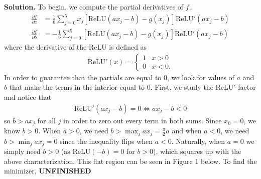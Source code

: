 \documentclass{letter}
\newcommand{\Solution}[1]{%
	\textbf{Solution.} #1 \par%
}
\newcommand{\UNFINISHED}{\textbf{\color{red} UNFINISHED}}
\newcommand{\relu}{\mathrm{ReLU}}
\begin{document}
    \Solution{To begin, we compute the partial derivatives of $f$. \begin{align*}
        \frac{\partial f}{\partial a} &= \frac{1}{6}\sum_{j = 0}^5 x_j[\relu(ax_j - b) - g(x_j)]\relu'(ax_j - b) \\
        \frac{\partial f}{\partial b} &= -\frac{1}{6}\sum_{j = 0}^5 [\relu(ax_j - b) - g(x_j)]\relu'(ax_j - b)
    \end{align*} where the derivative of the $\relu$ is defined as \begin{align*}
        \relu'(x) = \begin{cases} 1 & x > 0 \\ 0 & x < 0. \end{cases}
    \end{align*} In order to guarantee that the partials are equal to 0, we look for values of $a$ and $b$ that make the terms in the interior equal to 0. First, we study the $\relu'$ factor and notice that \begin{align*}
        \relu'(ax_j - b) = 0 \iff ax_j - b < 0
    \end{align*} so $b > ax_j$ for all $j$ in order to zero out every term in both sums. Since $x_0 = 0$, we know $b > 0$. When $a > 0$, we need $b > \max_j ax_j = \frac{\pi}{2}a$ and when $a < 0$, we need $b > \min_j ax_j = 0$ since the inequality flips when $a < 0$. Naturally, when $a = 0$ we simply need $b > 0$ (as $\relu(-b) = 0$ for $b > 0$), which squares up with the above characterization. This flat region can be seen in Figure 1 below. To find the minimizer, \UNFINISHED

}
\end{document}
